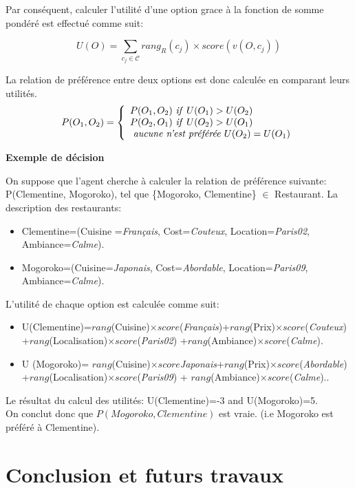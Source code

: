 \documentclass [french]{sig-alternate-05-2015}
\begin{document}
Par conséquent, calculer l'utilité d'une option grace à la fonction de somme pondéré est effectué comme suit:

\[U(O) = \sum_{c_j \in \mathcal{C}}  rang_R(c_j) \times score\left( v(O, c_j) \right) \] 


\par La relation de préférence entre deux options est donc calculée en comparant leurs utilités. 
\[ P(O_1, O_2)  = \left \{
\begin{array}{l}
P(O_1, O_2)$ \textit{if}  $U(O_1) > U(O_2) \\
P(O_2, O_1)$  \textit{if}  $U(O_2) > U(O_1) \\
$  \textit{aucune n'est préférée}  $U(O_2) = U(O_1)\\
\end{array}
\right .\]

 \par \textbf{Exemple de décision}

On suppose que l'agent cherche à calculer la relation de préférence suivante:  P(Clementine, Mogoroko), tel que 
\{Mogoroko, Clementine\} $\in$ Restaurant. La description des restaurants: 
\begin{itemize}
	\item Clementine=(Cuisine =\textit{Français}, Cost=\textit{Couteux}, Location=\textit{Paris02},
	\\Ambiance=\textit{Calme}).
	\item Mogoroko=(Cuisine=\textit{Japonais}, Cost=\textit{Abordable}, Location=\textit{Paris09}, 
	\\Ambiance=\textit{Calme}).
\end{itemize}

L'utilité de chaque option est calculée comme suit:
\begin{itemize}
	\item U(Clementine)=$rang$(Cuisine)$\times score$(\textit{Français})+$rang$(Prix)$\times score$(\textit{Couteux})\\+$rang$(Localisation)$\times score$(\textit{Paris02})
	+$rang$(Ambiance)$\times score$(\textit{Calme}).
	\item U (Mogoroko)= $rang$(Cuisine)$\times score$\textit{Japonais}+$rang$(Prix)$\times score$(\textit{Abordable})\\+$rang$(Localisation)$\times score$(\textit{Paris09}) +  
	$rang$(Ambiance)$\times score$(\textit{Calme})..
\end{itemize}
Le résultat du calcul des utilités: U(Clementine)=-3 and U(Mogoroko)=5.
\\  On conclut donc que $P(Mogoroko, Clementine)$ est vraie.
(i.e Mogoroko est préféré à Clementine).
\section{Conclusion et futurs travaux}
\label{conc}




\end{document}

